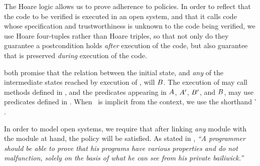 The Hoare logic allows us to prove adherence to policies. In order to
reflect that the code to be verified is executed in an open system,
and that it calls code whose specification and trustworthiness is
unknown to the code being verified, we use Hoare four-tuples rather
than Hoare triples, so that not only do they guarantee a postcondition
holds {\em after} execution of the code, but also guarantee that
 is preserved {\em during} execution of the code.


   both promise that the relation between
the initial state, and {\em any} of the   intermediate states reached by
execution of , will  $B$.
The execution of   may call methods defined in \M, and the
predicates appearing in $A$, $A'$, $B'$, and $B$, may use  predicates
  defined in \M. 
When \M\ is implicit from the context,
we use the shorthand
\Hoare{\A} {}  {\A'} {\B}. 


In order to model open systems, we require that after linking {\em any}
module with the module at hand, the policy will be satisfied. As
stated in \cite{JamesMorris}, \textit{``A programmer should be able to prove
that his programs have various properties and do not malfunction,
solely on the basis of what he can see from his private bailiwick.''}

 
